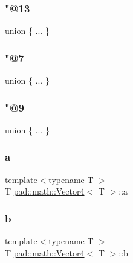 \mbox{\label{structpad_1_1math_1_1_vector4_a747cd9f13f7545072e42e201540a8dcd}} 
\subsubsection{\texorpdfstring{"@13}{@13}}
{\footnotesize\ttfamily union \{ ... \} }

\mbox{\label{structpad_1_1math_1_1_vector4_a24c818c0046fb8faabb56f64405d6cda}} 
\subsubsection{\texorpdfstring{"@7}{@7}}
{\footnotesize\ttfamily union \{ ... \} }

\mbox{\label{structpad_1_1math_1_1_vector4_a17be2a981a26a27c41382122c9c4c948}} 
\subsubsection{\texorpdfstring{"@9}{@9}}
{\footnotesize\ttfamily union \{ ... \} }

\mbox{\label{structpad_1_1math_1_1_vector4_afb5d50917f750bbe417871b7f290b10c}} 
\subsubsection{\texorpdfstring{a}{a}}
{\footnotesize\ttfamily template$<$typename T $>$ \\
T \mbox{\hyperlink{structpad_1_1math_1_1_vector4}{pad\+::math\+::\+Vector4}}$<$ T $>$\+::a}

\mbox{\label{structpad_1_1math_1_1_vector4_a00d2630fa1befcfa4c343e2f4187ec71}} 
\subsubsection{\texorpdfstring{b}{b}}
{\footnotesize\ttfamily template$<$typename T $>$ \\
T \mbox{\hyperlink{structpad_1_1math_1_1_vector4}{pad\+::math\+::\+Vector4}}$<$ T $>$\+::b}

